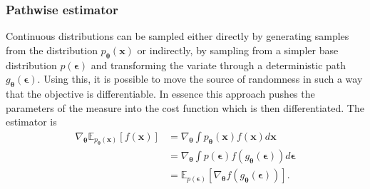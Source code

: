 \subsubsection{Pathwise estimator}
Continuous distributions can be sampled either directly by generating samples from the distribution $p_{\boldsymbol{\theta}}(\mathbf{x})$ or indirectly, by sampling from a simpler base distribution $p(\boldsymbol{\epsilon})$ and transforming the variate through a deterministic path $g_{\boldsymbol{\theta}}(\boldsymbol{\epsilon})$. Using this, it is possible to move the source of randomness in such a way that the objective is differentiable. In essence this approach pushes the parameters of the measure into the cost function which is then differentiated. The estimator is
\begin{equation}
	\begin{aligned}
		\nabla_{\boldsymbol{\theta}} \mathbb{E}_{p_{\boldsymbol{\theta}}(\mathbf{x})}[f(\mathbf{x})] 
		&=\nabla_{\boldsymbol{\theta}} \int p_{\boldsymbol{\theta}}(\mathbf{x}) f(\mathbf{x}) d \mathbf{x} \\
		&= \nabla_{\boldsymbol{\theta}} \int p(\boldsymbol{\epsilon}) f(g_{\boldsymbol{\theta}}(\boldsymbol{\epsilon})) d \boldsymbol{\epsilon} \\
		&= \mathbb{E}_{p(\boldsymbol{\epsilon})}\left[\nabla_{\boldsymbol{\theta}} f(g_{\boldsymbol{\theta}}(\boldsymbol{\epsilon}))\right].
	\end{aligned}
\end{equation}
